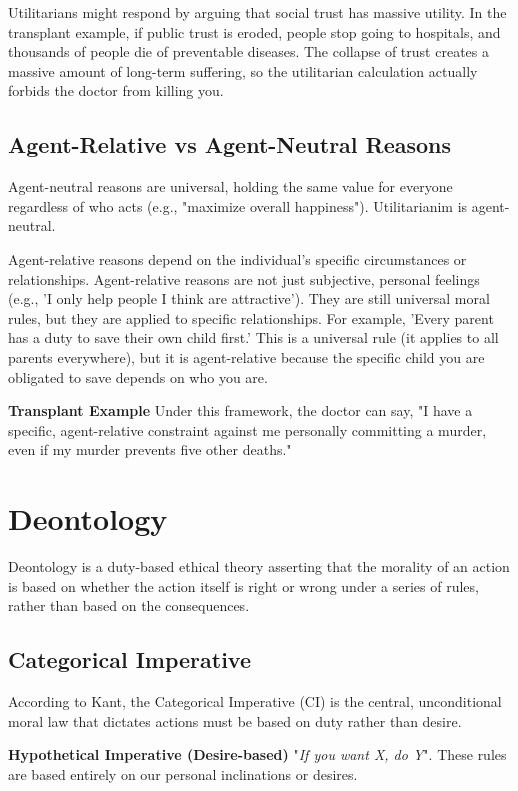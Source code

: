 \documentclass[12pt]{article}
\begin{document}
Utilitarians might respond by arguing that social trust has massive utility.
In the transplant example, if public trust is eroded, people stop going to hospitals, and thousands of people die of preventable diseases.
The collapse of trust creates a massive amount of long-term suffering, so the utilitarian calculation actually forbids the doctor from killing you.

\subsection{Agent-Relative vs Agent-Neutral Reasons}
Agent-neutral reasons are universal, holding the same value for everyone regardless of who acts (e.g., "maximize overall happiness").
Utilitarianim is agent-neutral.

\noindent Agent-relative reasons depend on the individual's specific circumstances or relationships.
Agent-relative reasons are not just subjective, personal feelings (e.g., 'I only help people I think are attractive').
They are still universal moral rules, but they are applied to specific relationships.
For example, 'Every parent has a duty to save their own child first.'
This is a universal rule (it applies to all parents everywhere), but it is agent-relative because the specific child you are obligated to save depends on who you are.

\noindent\textbf{Transplant Example} Under this framework, the doctor can say, "I have a specific, agent-relative constraint against me personally committing a murder, even if my murder prevents five other deaths."

\newpage 

\section{Deontology}
Deontology is a duty-based ethical theory asserting that the morality of an action is based on whether the action itself is right or wrong under a series of rules, rather than based on the consequences.

\subsection{Categorical Imperative}
According to Kant, the Categorical Imperative (CI) is the central, unconditional moral law that dictates actions must be based on duty rather than desire.

\noindent\textbf{Hypothetical Imperative (Desire-based)}
"\textit{If you want X, do Y}". These rules are based entirely on our personal inclinations or desires.
\end{document}
